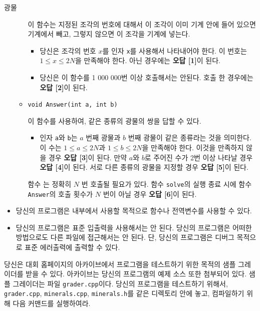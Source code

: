 \begin{problem}{광물}
\begin{itemize}
\begin{itemize}
			이 함수는 지정된 조각의 번호에 대해서 이 조각이 이미 기계 안에 들어 있으면 기계에서 빼고, 그렇지 않으면 이 조각을 기계에 넣는다.
						
			\begin{itemize}
				\item 당신은 조각의 번호 $x$를 인자 \texttt{x}를 사용해서 나타내어야 한다. 이 번호는 $1 \le x \le 2N$을 만족해야 한다. 아닌 경우에는 \textbf{오답 [1]}이 된다.
				
				\item 당신은 이 함수를 1 000 000번 이상 호출해서는 안된다. 호출 한 경우에는 \textbf{오답 [2]}이 된다.
			\end{itemize}
			
			\item \texttt{void Answer(int a, int b)}
			
			이 함수를 사용하여, 같은 종류의 광물의 쌍을 답할 수 있다.
			
			\begin{itemize}
				\item 인자 \texttt{a}와 \texttt{b}는 $a$ 번째 광물과 $b$ 번째 광물이 같은 종류라는 것을 의미한다. 이 수는 $1 \le a \le 2N$과 $1 \le b \le 2N$을 만족해야 한다. 이것을 만족하지 않을 경우 \textbf{오답 [3]}이 된다. 만약 $a$와 $b$로 주어진 수가 2번 이상 나타날 경우 \textbf{오답 [4]}이 된다. 서로 다른 종류의 광물을 지정할 경우 \textbf{오답 [5]}이 된다.
			\end{itemize}
		
			함수 는 정확히 $N$ 번 호출될 필요가 있다. 함수 \texttt{solve}의 실행 종료 시에 함수 \texttt{Answer}의 호출 횟수가 $N$ 번이 아닐 경우 \textbf{오답 [6]}이 된다.
		\end{itemize}
		
	\end{itemize}
	
	\Notes
	
	\begin{itemize}
		\item 당신의 프로그램은 내부에서 사용할 목적으로 함수나 전역변수를 사용할 수 있다.
		\item 당신의 프로그램은 표준 입출력을 사용해서는 안 된다. 당신의 프로그램은 어떠한 방법으로도 다른 파일에 접근해서는 안 된다. 단, 당신의 프로그램은 디버그 목적으로 표준 에러출력에 출력할 수 있다.
	\end{itemize}
	
	당신은 대회 홈페이지의 아카이브에서 프로그램을 테스트하기 위한 목적의 샘플 그레이더를 받을 수 있다. 아카이브는 당신의 프로그램의 예제 소스 또한 첨부되어 있다.
	샘플 그레이더는 파일 \texttt{grader.cpp}이다. 당신의 프로그램을 테스트하기 위해서, \texttt{grader.cpp}, \texttt{minerals.cpp}, \texttt{minerals.h}를 같은 디렉토리 안에 놓고, 컴파일하기 위해 다음 커맨드를 실행하여라.
	

\end{problem}

